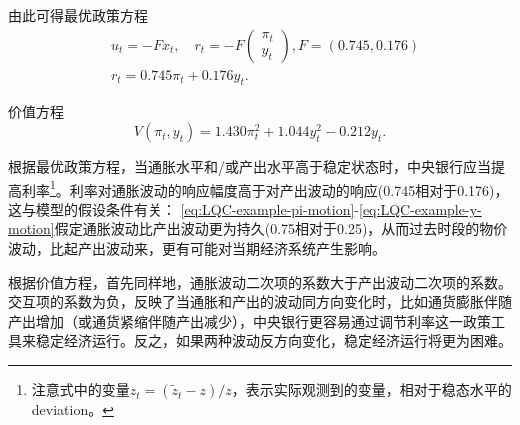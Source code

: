 由此可得最优政策方程
\begin{align}
  &u_t = - F x_t, \quad r_t = -F \begin{pmatrix} \pi_t \\ y_t \end{pmatrix}, F = (0.745, 0.176)\\
\label{eq:LQC-example-policy-function}
  & r_t = 0.745 \pi_t + 0.176 y_t.
\end{align}

价值方程
\begin{equation}
  \label{eq:LQC-example-value-function}
  V(\pi_t,y_t)= 1.430 \pi_t^2 + 1.044 y_t^2 - 0.212 y_t.
\end{equation}

根据最优政策方程，当通胀水平和/或产出水平高于稳定状态时，中央银行应当提高利率\footnote{注意式中的变量$z_t = (\tilde{z}_t - z)/z$，表示实际观测到的变量，相对于稳态水平的deviation。}。利率对通胀波动的响应幅度高于对产出波动的响应(0.745相对于0.176)，这与模型的假设条件有关：
\eqref{eq:LQC-example-pi-motion}-\eqref{eq:LQC-example-y-motion}假定通胀波动比产出波动更为持久(0.75相对于0.25)，从而过去时段的物价波动，比起产出波动来，更有可能对当期经济系统产生影响。

根据价值方程，首先同样地，通胀波动二次项的系数大于产出波动二次项的系数。交互项的系数为负，反映了当通胀和产出的波动同方向变化时，比如通货膨胀伴随产出增加（或通货紧缩伴随产出减少），中央银行更容易通过调节利率这一政策工具来稳定经济运行。反之，如果两种波动反方向变化，稳定经济运行将更为困难。
